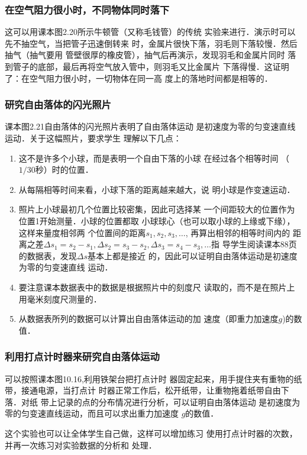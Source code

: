 \subsubsection{在空气阻力很小时，不同物体同时落下}
这可以用课本图2.20所示牛顿管（又称毛钱管）的传统
实验来进行．演示时可以先不抽空气，当把管子迅速倒转来
时，金属片很快下落，羽毛则下落较慢．然后抽气（抽气要用
管壁很厚的橡皮管），抽气后再演示，发现羽毛和金属片同时
落到管子的底部，最后再将空气放入管中，则羽毛又比金属片
下落得慢．这证明了：在空气阻力很小时，一切物体在同一高
度上的落地时间都是相等的．

\subsubsection{研究自由落体的闪光照片}
课本图2.21自由落体的闪光照片表明了自由落体运动
是初速度为零的匀变速直线运动．关于这幅照片，要求学生
理解以下几点：
\begin{enumerate}
\item 这不是许多个小球，而是表明一个自由下落的小球
在经过各个相等时间
（$1/30$秒）时的位置．
\item 从每隔相等时间来看，小球下落的距离越来越大，说
明小球是作变速运动．
\item 照片上小球最初几个位置比较密集，因此可选择某
一个间距较大的位置作为位置1开始测量．小球的位置都取
小球球心（也可以取小球的上缘或下缘），这样来量度相邻两
个位置间的距离$s_1,s_2,s_3,\ldots$, 再算出相邻的相等时间内的
距离之差$\Delta s_1=s_2-s_1,\Delta s_2=s_3-s_2,\Delta s_3=s_4-s_3,\ldots$指
导学生阅读课本88页的数据表，发现$\Delta s$基本上都是接近
的，因此可以证明自由落体运动是初速度为零的匀变速直线
运动．
\item 要注意课本数据表中的数据是根据照片中的刻度尺
读取的，而不是在照片上用毫米刻度尺测量的．
\item 从数据表所列的数据可以计算出自由落体运动的加
速度（即重力加速度$g$)的数值．
\end{enumerate}

\subsubsection{利用打点计时器来研究自由落体运动}
可以按照课本图10.16,利用铁架台把打点计时
器固定起来，用手提住夹有重物的纸带，接通电源，当打点计
时器正常工作后，松开纸带，让重物拖着纸带自由下落．对纸
带上记录的点的分布情况进行分析，可以证明自由落体运动
是初速度为零的匀变速直线运动，而且可以求出重力加速度
$g$的数值．

这个实验也可以让全体学生自己做，这样可以增加练习
使用打点计时器的次数，并再一次练习对实验数据的分析和
处理．


